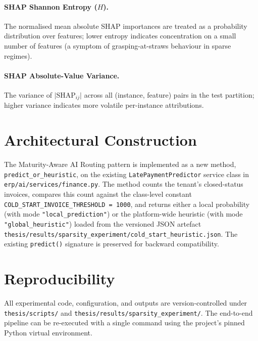 \paragraph{SHAP Shannon Entropy ($H$).} The normalised mean absolute SHAP importances are treated as a probability distribution over features; lower entropy indicates concentration on a small number of features (a symptom of grasping-at-straws behaviour in sparse regimes).

\paragraph{SHAP Absolute-Value Variance.} The variance of $\lvert \mathrm{SHAP}_{ij}\rvert$ across all (instance, feature) pairs in the test partition; higher variance indicates more volatile per-instance attributions.

\section{Architectural Construction}
\label{sec:methodology_arch}

The Maturity-Aware AI Routing pattern is implemented as a new method, \texttt{predict\_or\_heuristic}, on the existing \texttt{LatePaymentPredictor} service class in \texttt{erp/ai/services/finance.py}. The method counts the tenant's closed-status invoices, compares this count against the class-level constant \texttt{COLD\_START\_INVOICE\_THRESHOLD = 1000}, and returns either a local probability (with mode \texttt{"local\_prediction"}) or the platform-wide heuristic (with mode \texttt{"global\_heuristic"}) loaded from the versioned JSON artefact \texttt{thesis/results/sparsity\_experiment/cold\_start\_heuristic.json}. The existing \texttt{predict()} signature is preserved for backward compatibility.

\section{Reproducibility}
\label{sec:methodology_reproducibility}

All experimental code, configuration, and outputs are version-controlled under \texttt{thesis/scripts/} and \texttt{thesis/results/sparsity\_experiment/}. The end-to-end pipeline can be re-executed with a single command using the project's pinned Python virtual environment.
